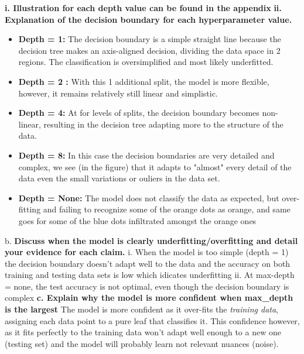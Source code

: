 \documentclass[acmconf,nonacm=true]{acmart}
\begin{document}
\textbf{i. Illustration for each depth value can be found in the appendix}
\newline
    \textbf{ii. Explanation of the decision boundary for each hyperparameter value.}
    \begin{itemize}
        \item \textbf{Depth = 1: }The decision boundary is a simple straight line because the decision tree makes an axis-aligned decision, dividing the data space in 2 regions. The classification is oversimplified and most likely underfitted.
    \end{itemize}
    \begin{itemize}
        \item \textbf{Depth = 2 :}  With this 1 additional split, the model is more flexible, however, it remains relatively still linear and simplistic.
    \end{itemize}
   \begin{itemize}
       \item \textbf{ Depth = 4: }At for levels of splits, the decision boundary becomes non-linear, resulting in the decision tree adapting more to the structure of the data.
   \end{itemize}
   \begin{itemize}
       \item \textbf{Depth = 8: } In this case the decision boundaries are very detailed and complex, we see (in the figure) that it adapts to "almost" every detail of the data even the small variations or ouliers in the data set.
       \item \textbf{Depth = None: } The model does not classify the data as expected, but over-fitting and failing to recognize some of the orange dots as orange, and same goes for some of the blue dots infiltrated amongst the orange ones
    \end{itemize}
b.  \textbf{Discuss when the model is clearly underfitting/overfitting and detail your evidence for each claim.}
    i. When the model is too simple (depth = 1) the decision boundary doesn't adapt well to the data and the accuracy on both training and testing data sets is low which idicates underfitting
    ii. At max-depth = none, the test accuracy is not optimal, even though the decision boundary is complex
    \textbf{c. Explain why the model is more confident when max\_depth is the largest} 
    The model is more confident as it over-fits the \textit{training data}, assigning each data point to a pure leaf that classifies it. This confidence however, as it fits perfectly to the training data won't adapt well enough to a new one (testing set) and the model will probably learn not relevant nuances (noise).  
\end{document}
